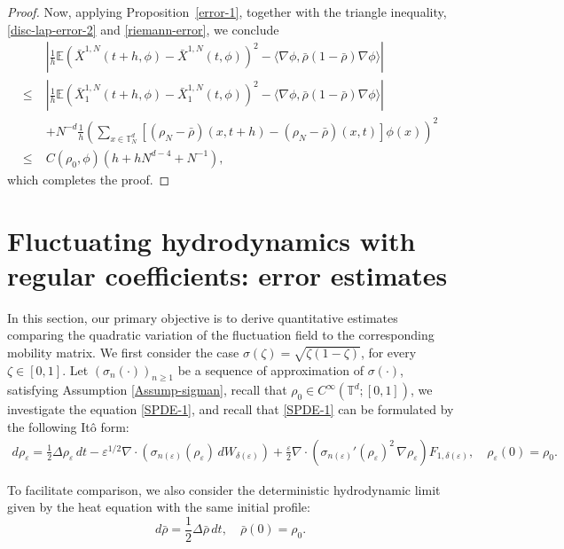 \documentclass[UTF-8,reqno]{amsart}
\numberwithin{equation}{section}
\def\geq{\geqslant}
\def\leq{\leqslant}
\def\geq{\geqslant}
\def\leq{\leqslant}
\begin{document}
\begin{proof}
Now, applying Proposition~\ref{error-1}, together with the triangle inequality, \eqref{disc-lap-error-2} and \eqref{riemann-error}, we conclude 
\begin{align*}
	&\left| \frac{1}{h} \mathbb{E}(\bar{X}^{1,N}(t+h,\phi) - \bar{X}^{1,N}(t,\phi))^2 - \langle \nabla\phi, \bar{\rho}(1-\bar{\rho}) \nabla\phi \rangle \right| \\
	\leq\;& \left| \frac{1}{h} \mathbb{E}(\bar{X}^{1,N}_1(t+h,\phi) - \bar{X}^{1,N}_1(t,\phi))^2 - \langle \nabla\phi, \bar{\rho}(1-\bar{\rho}) \nabla\phi \rangle \right| \\
	&+ N^{-d} \frac{1}{h} \left( \sum_{x \in \mathbb{T}^d_N} \left[ (\rho_N - \bar{\rho})(x,t+h) - (\rho_N - \bar{\rho})(x,t) \right] \phi(x) \right)^2 \\
	\leq\;&  C(\rho_0,\phi)\left(h + hN^{d-4}+N^{-1}\right), 
\end{align*}
which completes the proof.
\end{proof}


\section{Fluctuating hydrodynamics with regular coefficients: error estimates}\label{sec-5}

In this section, our primary objective is to derive quantitative estimates comparing the quadratic variation of the fluctuation field to the corresponding mobility matrix. We first consider the case $\sigma(\zeta)=\sqrt{\zeta(1-\zeta)}$, for every $\zeta\in[0,1]$. Let $(\sigma_n(\cdot))_{n\geq1}$ be a sequence of approximation of $\sigma(\cdot)$, satisfying Assumption \ref{Assump-sigman}, recall that $\rho_0\in C^{\infty}(\mathbb{T}^d;[0,1])$, we investigate the equation \eqref{SPDE-1}, and recall that \eqref{SPDE-1} can be formulated by the following It\^o form: 
\begin{align}\label{SPDE-1-ito-sec-5}
d\rho_{\varepsilon} = \frac{1}{2}\Delta \rho_{\varepsilon}\,dt - \varepsilon^{1/2} \nabla\cdot\left(\sigma_{n(\varepsilon)}(\rho_{\varepsilon})\, dW_{\delta(\varepsilon)}\right) + \frac{\varepsilon}{2} \nabla\cdot\left(\sigma_{n(\varepsilon)}'(\rho_{\varepsilon})^2\, \nabla \rho_{\varepsilon} \right) F_{1,\delta(\varepsilon)},\quad \rho_{\varepsilon}(0)=\rho_0. 
\end{align}

To facilitate comparison, we also consider the deterministic hydrodynamic limit given by the heat equation with the same initial profile:
\begin{equation}\label{PDE}
d\bar{\rho} = \frac{1}{2}\Delta\bar{\rho}\, dt, \quad \bar{\rho}(0) = \rho_0.
\end{equation}
\end{document}
